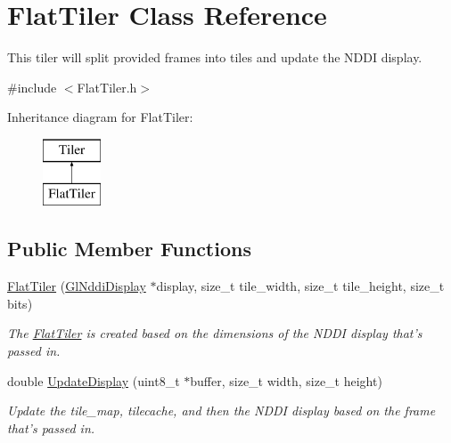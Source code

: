 \hypertarget{class_flat_tiler}{
\section{FlatTiler Class Reference}
\label{class_flat_tiler}
}


This tiler will split provided frames into tiles and update the NDDI display.  




{\ttfamily \#include $<$FlatTiler.h$>$}

Inheritance diagram for FlatTiler:\begin{figure}[H]
\begin{center}
\leavevmode
\includegraphics[height=2.000000cm]{class_flat_tiler}
\end{center}
\end{figure}
\subsection*{Public Member Functions}
\begin{DoxyCompactItemize}
\item 
\hyperlink{class_flat_tiler_a2781a873e04ae4a8fa5cd8187b7588bc}{FlatTiler} (\hyperlink{class_gl_nddi_display}{GlNddiDisplay} $\ast$display, size\_\-t tile\_\-width, size\_\-t tile\_\-height, size\_\-t bits)
\begin{DoxyCompactList}\small\item\em The \hyperlink{class_flat_tiler}{FlatTiler} is created based on the dimensions of the NDDI display that's passed in. \item\end{DoxyCompactList}\item 
double \hyperlink{class_flat_tiler_a6e0bdcd30a8faad5b366e3b9d6ff89cd}{UpdateDisplay} (uint8\_\-t $\ast$buffer, size\_\-t width, size\_\-t height)
\begin{DoxyCompactList}\small\item\em Update the tile\_\-map, tilecache, and then the NDDI display based on the frame that's passed in. \item\end{DoxyCompactList}\end{DoxyCompactItemize}


